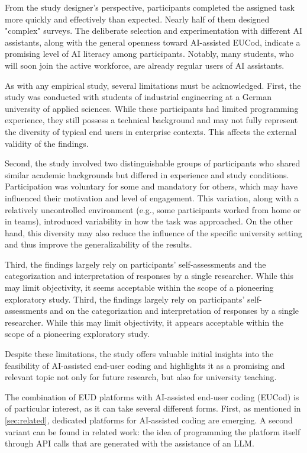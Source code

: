 \documentclass[english,anonymous]{lni}
\begin{document}
From the study designer’s perspective, participants completed the assigned task more quickly and effectively than expected. Nearly half of them designed "complex" surveys. The deliberate selection and experimentation with different AI assistants, along with the general openness toward AI-assisted EUCod, indicate a promising level of AI literacy among participants. Notably, many students, who will soon join the active workforce,  are already regular users of AI assistants.


As with any empirical study, several limitations must be acknowledged. First, the study was conducted with students of industrial engineering at a German university of applied sciences. While these participants had limited programming experience, they still possess a technical background and may not fully represent the diversity of typical end users in enterprise contexts. This affects the external validity of the findings.

Second, the study involved two distinguishable groups of participants who shared similar academic backgrounds but differed in experience and study conditions. Participation was voluntary for some and mandatory for others, which may have influenced their motivation and level of engagement. This variation, along with a relatively uncontrolled environment (e.g., some participants worked from home or in teams), introduced variability in how the task was approached. On the other hand, this diversity may also reduce the influence of the specific university setting and thus improve the generalizability of the results.

Third, the findings largely rely on participants’ self-assessments and the categorization and interpretation of responses by a single researcher. While this may limit objectivity, it seems acceptable within the scope of a pioneering exploratory study.
Third, the findings largely rely on participants’ self-assessments and on the categorization and interpretation of responses by a single researcher. While this may limit objectivity, it appears acceptable within the scope of a pioneering exploratory study.

Despite these limitations, the study offers valuable initial insights into the feasibility of AI-assisted end-user coding and highlights it as a promising and relevant topic not only for future research, but also for university teaching.

The combination of EUD platforms with AI-assisted end-user coding (EUCod) is of particular interest, as it can take several different forms. First, as mentioned in \cref{sec:related}, dedicated platforms for AI-assisted coding are emerging. A second variant can be found in related work: the idea of programming the platform itself through API calls  that are generated with the assistance of an LLM. 
\end{document}
